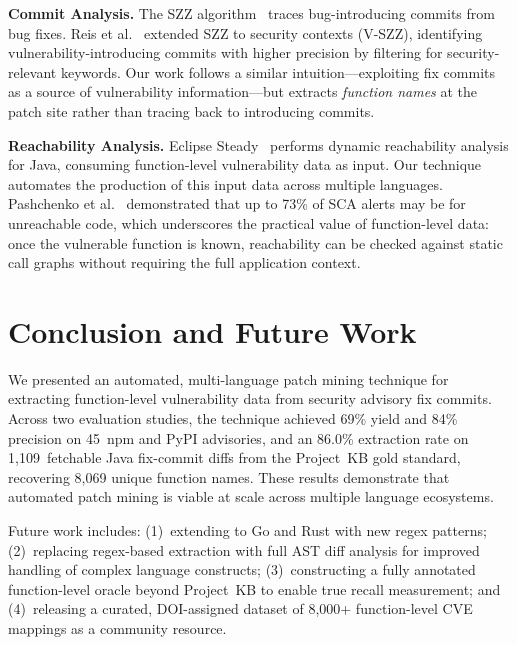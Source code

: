 \documentclass[sigconf,nonacm]{acmart}
\begin{document}
\textbf{Commit Analysis.}
The SZZ algorithm~\cite{sliwerski2005szz} traces bug-introducing commits
from bug fixes.
Reis et al.~\cite{reis2021vszz} extended SZZ to security contexts
(V-SZZ), identifying vulnerability-introducing commits with higher
precision by filtering for security-relevant keywords.
Our work follows a similar intuition---exploiting fix commits as a source
of vulnerability information---but extracts \emph{function names} at the
patch site rather than tracing back to introducing commits.

\textbf{Reachability Analysis.}
Eclipse Steady~\cite{plate2015eclipsesteady} performs dynamic reachability
analysis for Java, consuming function-level vulnerability data as input.
Our technique automates the production of this input data across multiple
languages.
Pashchenko et al.~\cite{pashchenko2020qualitative} demonstrated that up to
73\% of SCA alerts may be for unreachable code, which underscores the
practical value of function-level data: once the vulnerable function is
known, reachability can be checked against static call graphs without
requiring the full application context.

\section{Conclusion and Future Work}
\label{sec:conclusion}

We presented an automated, multi-language patch mining technique for
extracting function-level vulnerability data from security advisory fix
commits.
Across two evaluation studies, the technique achieved 69\% yield and
84\% precision on 45~npm and PyPI advisories, and an 86.0\% extraction
rate on 1{,}109~fetchable Java fix-commit diffs from the Project~KB
gold standard, recovering 8{,}069 unique function names.
These results demonstrate that automated patch mining is viable at
scale across multiple language ecosystems.

Future work includes: (1)~extending to Go and Rust with new regex
patterns; (2)~replacing regex-based extraction with full AST diff
analysis for improved handling of complex language constructs;
(3)~constructing a fully annotated function-level oracle beyond
Project~KB to enable true recall measurement; and
(4)~releasing a curated, DOI-assigned dataset of 8{,}000+
function-level CVE mappings as a community resource.

\end{document}
